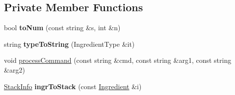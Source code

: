 \subsection*{Private Member Functions}
\begin{DoxyCompactItemize}
\item 
\hypertarget{classRecipe_a172cb7622220cfb41d6106aec1722493}{bool {\bfseries to\-Num} (const string \&s, int \&n)}\label{classRecipe_a172cb7622220cfb41d6106aec1722493}

\item 
\hypertarget{classRecipe_ac8471305ea877c360e4f6793ba4c34dd}{string {\bfseries type\-To\-String} (Ingredient\-Type \&it)}\label{classRecipe_ac8471305ea877c360e4f6793ba4c34dd}

\item 
void \hyperlink{classRecipe_aa0255f5a048027bb27d436add096db83}{process\-Command} (const string \&cmd, const string \&arg1, const string \&arg2)
\item 
\hypertarget{classRecipe_a280aeb473fd69ef19df3654a54408d02}{\hyperlink{structStackInfo}{Stack\-Info} {\bfseries ingr\-To\-Stack} (const \hyperlink{classIngredient}{Ingredient} \&i)}\label{classRecipe_a280aeb473fd69ef19df3654a54408d02}


\end{DoxyCompactItemize}
